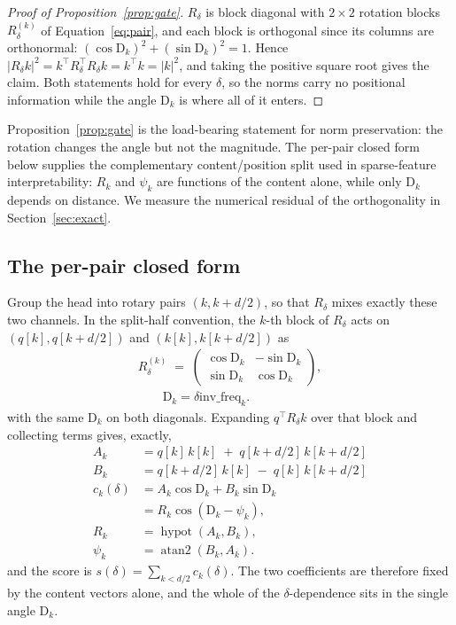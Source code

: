 \documentclass{article}
\theoremstyle{plain}
\theoremstyle{remark}
\newcommand{\R}{R}
\newcommand{\invf}{\mathrm{inv\_freq}}
\newcommand{\D}{\mathrm{D}_k}
\newcommand{\Ak}{A_k}
\newcommand{\Bk}{B_k}
\newcommand{\Rk}{R_k}
\newcommand{\psik}{\psi_k}
\newcommand{\half}{d/2}
\begin{document}
\begin{proof}[Proof of Proposition~\ref{prop:gate}]
$\R_\delta$ is block diagonal with $2\times 2$ rotation blocks
$\R_\delta^{(k)}$ of Equation~\ref{eq:pair}, and each block is orthogonal since
its columns are orthonormal: $(\cos\D)^2 + (\sin\D)^2 = 1$. Hence
$\bigl|\R_\delta k\bigr|^2 = k^{\!\top}\R_\delta^{\!\top}\R_\delta k =
k^{\!\top}k = \bigl|k\bigr|^2$, and taking the positive square root gives the
claim. Both statements hold for every $\delta$, so the norms carry no positional
information while the angle $\D$ is where all of it enters.
\end{proof}

Proposition~\ref{prop:gate} is the load-bearing statement for norm preservation:
the rotation changes the angle but not the magnitude. The per-pair closed form
below supplies the complementary content/position split used in sparse-feature
interpretability: $\Rk$ and $\psik$ are functions of the content alone, while
only $\D$ depends on distance. We measure the numerical residual of the
orthogonality in Section~\ref{sec:exact}.

\subsection{The per-pair closed form}
\label{sec:pair}

Group the head into rotary pairs $(k, k + \half)$, so that $\R_{\delta}$ mixes
exactly these two channels. In the split-half convention, the $k$-th block of
$\R_{\delta}$ acts on $(q[k], q[k+\half])$ and $(k[k], k[k+\half])$ as
\begin{equation}
  \begin{split}
    \R_\delta^{(k)} \;=\;
    \begin{pmatrix} \cos \D & -\sin \D \\ \sin \D & \cos \D \end{pmatrix},
    \\[-1pt]
    \qquad \D = \delta \invf_k .
  \end{split}
  \label{eq:pair}
\end{equation}
with the same $\D$ on both diagonals. Expanding $q^{\!\top}\R_{\delta}k$ over
that block and collecting terms gives, exactly,
\begin{align}
  \Ak &= q[k]\,k[k] \;+\; q[k+\half]\,k[k+\half] \label{eq:A}\\
  \Bk &= q[k+\half]\,k[k] \;-\; q[k]\,k[k+\half] \label{eq:B}\\
  c_k(\delta) &= \Ak \cos\D + \Bk \sin\D \\
  &= \Rk\cos(\D - \psik), \\
  \Rk &= \operatorname{hypot}(\Ak, \Bk), \\
  \psik &= \operatorname{atan2}(\Bk, \Ak).
\end{align}
and the score is $s(\delta) = \sum_{k < \half} c_k(\delta)$. The two
coefficients are therefore fixed by the content vectors alone, and the whole of
the $\delta$-dependence sits in the single angle $\D$.
\end{document}
